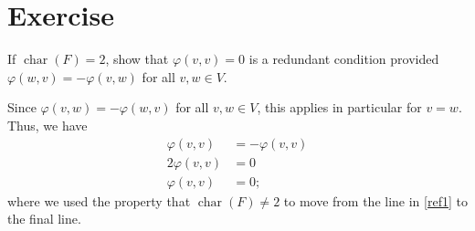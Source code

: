 \documentclass[10pt]{mypackage}
\begin{document}
\section{Exercise}%
\begin{problem}
  If $\operatorname{char}(F) = 2$, show that $\varphi\left(v,v\right) = 0$ is a redundant condition provided $\varphi\left(w,v\right)=-\varphi\left(v,w\right)$ for all $v,w\in V$.
\end{problem}
\begin{solution}
  Since $\varphi\left(v,w\right) = -\varphi\left(w,v\right)$ for all $v,w\in V$, this applies in particular for $v =w$. Thus, we have
  \begin{align*}
    \varphi\left(v,v\right) &= -\varphi\left(v,v\right)\\
    2\varphi\left(v,v\right) &= 0\label{ref1}\tag*{(\textasteriskcentered)}\\
    \varphi\left(v,v\right) &= 0;
  \end{align*}
  where we used the property that $\operatorname{char}\left(F\right)\neq 2$ to move from the line in \ref{ref1} to the final line.
\end{solution}
\end{document}
